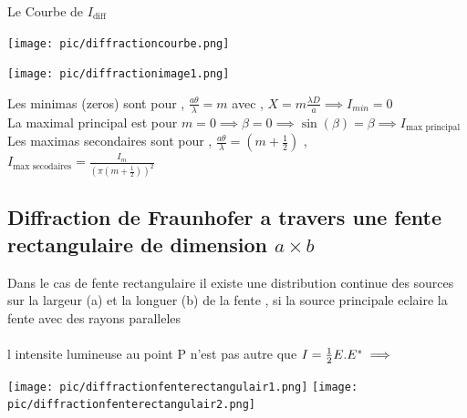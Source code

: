 \documentclass[12pt]{book}
\begin{document}
                Le Courbe de $I_{\text{diff}}$\\
                \begin{center}
                    \begin{minipage}{0.39\linewidth}
                        \texttt{[image: pic/diffractioncourbe.png]}
                    \end{minipage}
                    \begin{minipage}{0.59\linewidth}
                        \texttt{[image: pic/diffractionimage1.png]}
                    \end{minipage}
                \end{center}
                Les minimas (zeros) sont pour  , $\frac{a\theta}{\lambda}=m $ avec  , $X=m\frac{\lambda D}{a} \implies I_{min} = 0$ \\
                La maximal principal est pour  $m = 0 \implies \beta =0 \implies \sin(\beta ) = \beta \implies I_{\text{max principal}}$\\
                Les maximas secondaires sont pour  , $\frac{a\theta}{\lambda} = (m+\frac{1}{2})$  ,\\  $I_{\text{max secodaires}} = \frac{I_m}{(\pi(m+\frac{1}{2}))^2}$
            \subsection{Diffraction de Fraunhofer a travers une fente rectangulaire de dimension $a \times b$}    
                Dans le cas de fente rectangulaire il existe une distribution continue des sources sur la largeur (a) et la longuer (b) de la fente , si la source principale eclaire la fente avec des rayons paralleles \\
                \\
                l intensite lumineuse au point P n'est pas autre que $ I =\frac{1}{2}E.E^{*} \\ 
                \implies $  \\
                \begin{center}
                    \texttt{[image: pic/diffractionfenterectangulair1.png]}
                    \texttt{[image: pic/diffractionfenterectangulair2.png]}
                \end{center}
        \pagebreak
\end{document}
